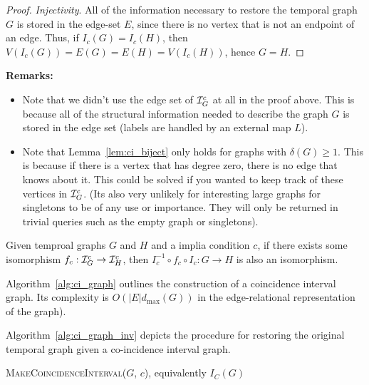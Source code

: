 {\begin{proof}[Proof]
  \textit{Injectivity}. All of the information necessary to restore the temporal graph $G$ is
  stored in the edge-set $E$, since there is no vertex that is not an endpoint of an
  edge. Thus, if $I_c(G) = I_c(H)$, then $V(I_c(G)) = E(G) = E(H) = V(I_c(H))$,
  hence $G = H$.
\end{proof}


\clearpage
\noindent \textbf{Remarks:}
\begin{itemize}
  \item Note that we didn't use the edge set of $\mathcal{I}^c_G$ at all in the proof
    above. This is because all of the structural information needed to describe
    the graph $G$ is stored in the edge set (labels are handled by an external
    map $L$).
  \item Note that Lemma~\ref{lem:ci_biject} only holds for graphs with
    $\delta(G) \geq 1$. This is because if there is a vertex that has degree
    zero, there is no edge that knows about it. This could be solved if you
    wanted to keep track of these vertices in $\mathcal{I}^c_G$. (Its also very unlikely
    for interesting large graphs for singletons to be of any use or
    importance. They will only be returned in trivial queries such as the empty
    graph or singletons).
\end{itemize}

\begin{corollary} Given temproal graphs $G$ and $H$ and a implia condition $c$, if there exists some
isomorphism $f_c : \mathcal{I}^c_G \to \mathcal{I}^c_H$, then $I_c^{-1} \circ f_c \circ I_c : G
\to H$ is also an isomorphism.
\end{corollary}


Algorithm~\ref{alg:ci_graph} outlines the  construction of a coincidence interval 
graph. Its complexity  is $O(|E|d_{\max}(G))$ in the
edge-relational representation of the graph). 

Algorithm~\ref{alg:ci_graph_inv} depicts the procedure for restoring the original temporal graph given a co-incidence interval graph. 


\begin{algorithm}
  \label{alg:ci_graph}
  \caption{\textsc{MakeCoincidenceInterval($G$, $c$)}, equivalently $I_C(G)$}
  \SetAlgoLined


\end{algorithm}}
